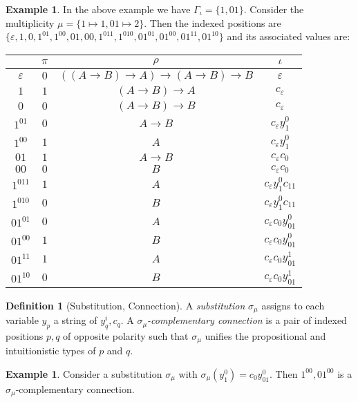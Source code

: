 \documentclass[11pt]{article}
\theoremstyle{definition}
\theoremstyle{definition}
\theoremstyle{definition}
\theoremstyle{definition}
\theoremstyle{definition}
\newtheorem{definition}[theorem]{Definition}
\theoremstyle{definition}
\newtheorem{example}[theorem]{Example}
\theoremstyle{definition}
\begin{document}
	\begin{example}
		In the above example we have $\Gamma_\iota = \{1, 01\}$. Consider the multiplicity $\mu = \{1\mapsto 1, 01\mapsto 2\}$. Then the indexed positions are $\{\varepsilon, 1, 0, 1^01, 1^00, 01, 00, 1^011, 1^010, 01^01, 01^00, 01^11, 01^10\}$ and its associated values are:
		\begin{center}
			\begin{tabular}{c|c|c|c}
				&$\pi$&$\rho$&$\iota$\\\hline
				$\varepsilon$&$0$&$((A\to B)\to A)\to(A\to B)\to B$&$\varepsilon$\\
				$1$&$1$&$(A\to B)\to A$&$c_\varepsilon$\\
				$0$&$0$&$(A\to B)\to B$&$c_\varepsilon$\\
				$1^01$&$0$&$A\to B$&$c_\varepsilon y_1^0$\\
				$1^00$&$1$&$A$&$c_\varepsilon y_1^0$\\
				$01$&$1$&$A\to B$&$c_\varepsilon c_0$\\
				$00$&$0$&$B$&$c_\varepsilon c_0$\\
				$1^011$&$1$&$A$&$c_\varepsilon y_1^0c_{11}$\\
				$1^010$&$0$&$B$&$c_\varepsilon y_1^0c_{11}$\\
				$01^01$&$0$&$A$&$c_\varepsilon c_0y_{01}^0$\\
				$01^00$&$1$&$B$&$c_\varepsilon c_0y_{01}^0$\\
				$01^11$&$1$&$A$&$c_\varepsilon c_0y_{01}^1$\\
				$01^10$&$0$&$B$&$c_\varepsilon c_0y_{01}^1$
			\end{tabular}
			\end{center}
	\end{example}

	\begin{definition}[Substitution, Connection]
		A \emph{substitution} $\sigma_\mu$ assigns to each variable $y_p$ a string of $y_q^i, c_q$. A \emph{$\sigma_\mu$-complementary connection} is a pair of indexed positions $p, q$ of opposite polarity such that $\sigma_\mu$ unifies the propositional and intuitionistic types of $p$ and $q$.
	\end{definition}

	\begin{example}
		Consider a substitution $\sigma_\mu$ with $\sigma_\mu(y_1^0) = c_0y_{01}^0$. Then $1^00, 01^00$ is a $\sigma_\mu$-complementary connection.
	\end{example}
\end{document}
